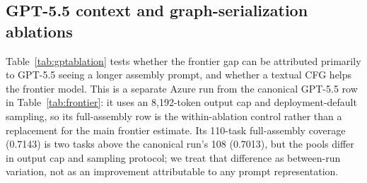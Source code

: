 \documentclass[11pt]{article}
\begin{document}
\begin{table}[t]
\centering
\small
\caption{Frontier models (zero-shot, full assembly, no graph channel) versus specialized arms on the 154-task pass set. compile@k uses the primary JIT/pass-harness definition on the same candidate-plus-tests files as pass@k, so pass@k is nested under compile@k. Empty or failed hosted responses remain failed sample slots. Best in each column is in \textbf{bold}.}
\label{tab:frontier}
\end{table}

\subsection{GPT-5.5 context and graph-serialization ablations}

Table~\ref{tab:gptablation} tests whether the frontier gap can be attributed primarily to GPT-5.5 seeing a longer assembly prompt, and whether a textual CFG helps the frontier model. This is a separate Azure run from the canonical GPT-5.5 row in Table~\ref{tab:frontier}: it uses an 8{,}192-token output cap and deployment-default sampling, so its full-assembly row is the within-ablation control rather than a replacement for the main frontier estimate. Its 110-task full-assembly coverage (0.7143) is two tasks above the canonical run's 108 (0.7013), but the pools differ in output cap and sampling protocol; we treat that difference as between-run variation, not as an improvement attributable to any prompt representation.
\end{document}
